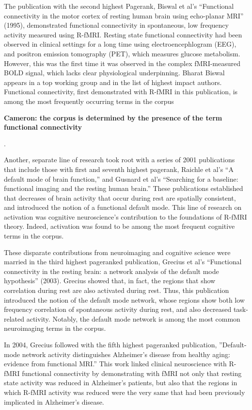\documentclass[5p]{elsarticle}
\newcommand\MyCBox[1]{%
  \colorbox{yellow!60}{\begin{varwidth}{\dimexpr\linewidth-2\fboxsep}#1\end{varwidth}}}
\newcommand{\COMMENTCC}[1]{\MyCBox{\textcolor{cc_commentcolor}{\textbf{Cameron:
#1}}}}
\begin{document}
The publication with the second highest Pagerank, Biswal et al’s
``Functional connectivity in the motor cortex of resting human brain using
echo-planar MRI'' (1995)\cite{Biswal1995}, demonstrated functional
connectivity in spontaneous, low frequency activity measured using R-fMRI.
Resting state functional connectivity had been observed in clinical
settings for a long time using electroencephlogram (EEG), and positron
emission tomography (PET), which measures glucose metabolism. However,
this was the first time it was observed in the complex fMRI-measured BOLD
signal, which lacks clear physiological underpinning. Bharat Biswal
appears in a top working group and in the list of highest impact authors.
Functional connectivity, first demonstrated with R-fMRI in this
publication, is among the most frequently occurring terms in the corpus
\COMMENTCC{the corpus is determined by the presence of the term functional
connectivity}. 

Another, separate line of research took root with a series of 2001
publications that include those with first and seventh highest pagerank,
Raichle et al’s ``A default mode of brain function,'' and Gusnard et al’s
``Searching for a baseline: functional imaging and the resting human
brain.'' These publications established that decreases of brain activity
that occur during rest are spatially consistent, and introduced the notion
of a functional default mode. This line of research on activation was
cognitive neuroscience’s contribution to the foundations of R-fMRI theory.
Indeed, activation was found to be among the most frequent cognitive terms
in the corpus.

These disparate contributions from neuroimaging and cognitive science were
married in the third highest pageranked publication, Grecius et al’s
``Functional connectivity in the resting brain: a network analysis of the
default mode hypothesis'' (2003). Grecius showed that, in fact, the
regions that show correlation during rest are also activated during rest.
Thus, this publication introduced the notion of the default mode network,
whose regions show both low frequency correlation of spontaneous activity
during rest, and also decreased task-related activity. Notably, the
default mode network is among the most common neuroimaging terms in the
corpus.

In 2004, Grecius followed with the fifth highest pageranked publication,
''Default-mode network activity distinguishes Alzheimer’s disease from
healthy aging: evidence from functional MRI.'' This work linked clinical
neuroscience with R-fMRI functional connectivity by demonstrating with
fMRI not only that resting state activity was reduced in Alzheimer’s
patients, but also that the regions in which R-fMRI activity was reduced
were the very same that had been previously implicated in Alzheimer’s
disease. 
\end{document}
